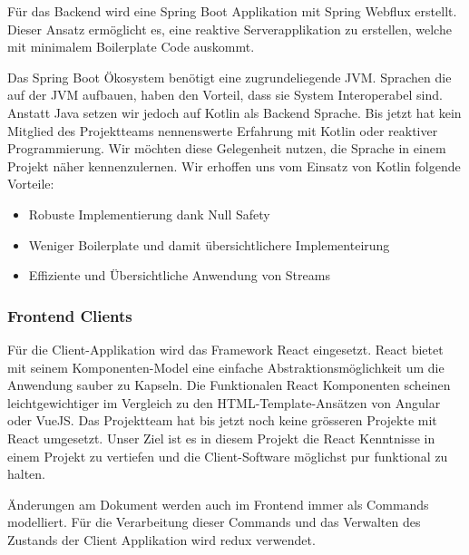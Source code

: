 Für das Backend wird eine Spring Boot Applikation mit Spring Webflux erstellt.
Dieser Ansatz ermöglicht es, eine reaktive Serverapplikation zu erstellen, welche mit minimalem Boilerplate Code auskommt.

Das Spring Boot Ökosystem benötigt eine zugrundeliegende JVM\@.
Sprachen die auf der JVM aufbauen, haben den Vorteil, dass sie System Interoperabel sind.
Anstatt Java setzen wir jedoch auf Kotlin als Backend Sprache.
Bis jetzt hat kein Mitglied des Projektteams nennenswerte Erfahrung mit Kotlin oder reaktiver Programmierung.
Wir möchten diese Gelegenheit nutzen, die Sprache in einem Projekt näher kennenzulernen.
Wir erhoffen uns vom Einsatz von Kotlin folgende Vorteile:

\begin{itemize}
    \item Robuste Implementierung dank Null Safety
    \item Weniger Boilerplate und damit übersichtlichere Implementeirung
    \item Effiziente und Übersichtliche Anwendung von Streams
\end{itemize}

\subsubsection{Frontend Clients}

Für die Client-Applikation wird das Framework React eingesetzt.
React bietet mit seinem Komponenten-Model eine einfache Abstraktionsmöglichkeit um die Anwendung sauber zu Kapseln.
Die Funktionalen React Komponenten scheinen leichtgewichtiger im Vergleich zu den HTML-Template-Ansätzen von Angular oder VueJS\@.
Das Projektteam hat bis jetzt noch keine grösseren Projekte mit React umgesetzt.
Unser Ziel ist es in diesem Projekt die React Kenntnisse in einem Projekt zu vertiefen und die Client-Software möglichst pur funktional zu halten.

Änderungen am Dokument werden auch im Frontend immer als Commands modelliert.
Für die Verarbeitung dieser Commands und das Verwalten des Zustands der Client Applikation wird redux verwendet.

